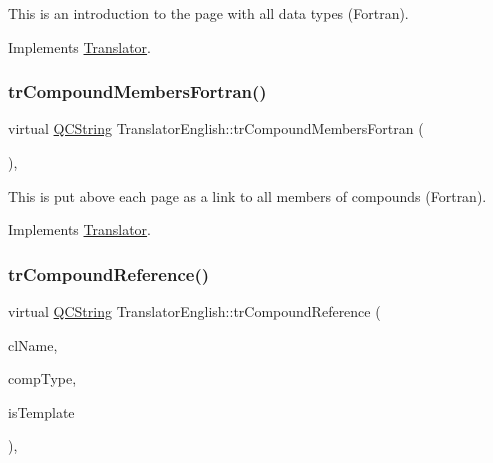 This is an introduction to the page with all data types (Fortran). 

Implements \mbox{\hyperlink{class_translator}{Translator}}.

\mbox{\label{class_translator_english_a6d110c1700f228c6352cf365506aa59b}} 
\subsubsection{\texorpdfstring{trCompoundMembersFortran()}{trCompoundMembersFortran()}}
{\footnotesize\ttfamily virtual \mbox{\hyperlink{class_q_c_string}{Q\+C\+String}} Translator\+English\+::tr\+Compound\+Members\+Fortran (\begin{DoxyParamCaption}{ }\end{DoxyParamCaption})\hspace{0.3cm}{\ttfamily [inline]}, {\ttfamily [virtual]}}

This is put above each page as a link to all members of compounds (Fortran). 

Implements \mbox{\hyperlink{class_translator}{Translator}}.

\mbox{\label{class_translator_english_a52acde09dc08e65bed1b84cd96c735e5}} 
\subsubsection{\texorpdfstring{trCompoundReference()}{trCompoundReference()}}
{\footnotesize\ttfamily virtual \mbox{\hyperlink{class_q_c_string}{Q\+C\+String}} Translator\+English\+::tr\+Compound\+Reference (\begin{DoxyParamCaption}\item[{const char $\ast$}]{cl\+Name,  }\item[{\mbox{\hyperlink{class_class_def_ae70cf86d35fe954a94c566fbcfc87939}{Class\+Def\+::\+Compound\+Type}}}]{comp\+Type,  }\item[{bool}]{is\+Template }\end{DoxyParamCaption})\hspace{0.3cm}{\ttfamily [inline]}, {\ttfamily [virtual]}}

